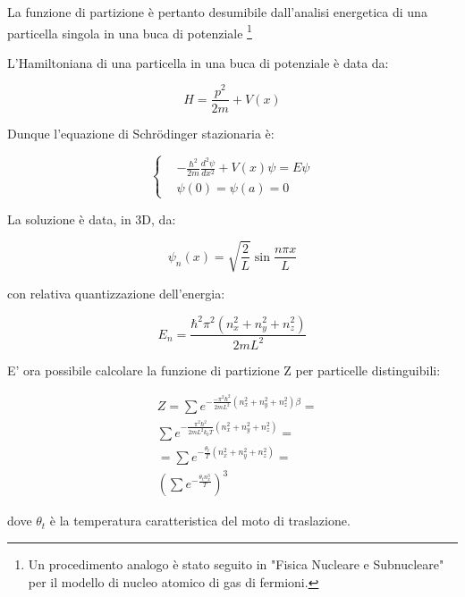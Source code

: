 \documentclass{article}
\begin{document}
La funzione di partizione è pertanto desumibile dall'analisi energetica di una particella singola in una buca di potenziale \footnote{
    Un procedimento analogo è stato seguito in "Fisica Nucleare e Subnucleare" per il modello di nucleo atomico di gas di fermioni.
}

L'Hamiltoniana di una particella in una buca di potenziale è data da:

\begin{equation}
    H=\frac{p^2}{2m}+V(x)
\end{equation}

Dunque l'equazione di Schrödinger stazionaria è:

\begin{equation}
    \left\{
    \begin{aligned}
         & -\frac{\hbar^2}{2m}\frac{d^2\psi}{dx^2}+V(x)\psi=E\psi \\
         & \psi(0)=\psi(a)=0
    \end{aligned}
    \right.
\end{equation}

La soluzione è data, in 3D, da:

\begin{equation}
    \psi_n(x)=\sqrt{\frac{2}{L}}\sin{\frac{n\pi x}{L}}
\end{equation}

con relativa quantizzazione dell'energia:

\begin{equation}
    E_n=\frac{\hbar^2\pi^2(n_x^2+n_y^2+n_z^2)}{2mL^2}
\end{equation}

E' ora possibile calcolare la funzione di partizione Z per particelle distinguibili:

\begin{equation}
    \begin{aligned}
         & Z=\sum e^{-\frac{-\pi^2\hbar^2}{2mL^2}(n_x^2+n_y^2+n_z^2)\beta}= \\
         & \sum e^{-\frac{\pi^2\hbar^2}{2mL^2k_bT}(n_x^2+n_y^2+n_z^2)}=     \\
         & =\sum e^{-\frac{\theta_t}{T}(n_x^2+n_y^2+n_z^2)}=                \\
         & \left(\sum e^{-\frac{\theta_tn_x^3}{T}}\right)^3
    \end{aligned}
\end{equation}

dove $\theta_t$ è la temperatura caratteristica del moto di traslazione.
\end{document}
